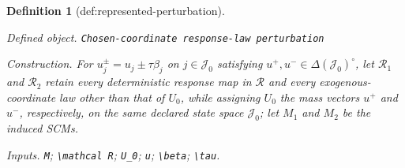\documentclass{article}
\newtheorem{definition}{Definition}
\begin{document}
\begin{definition}[def:represented-perturbation]\label{def:represented-perturbation}
\par\smallskip\noindent\emph{Defined object.} \texttt{Chosen-\allowbreak{}coordinate response-\allowbreak{}law perturbation}
\par\smallskip\noindent\emph{Construction.} For \(u^{\pm}_j=u_j\pm\tau\beta_j\) on \(j\in\mathcal J_0\) satisfying \(u^+,u^-\in\Delta(\mathcal J_0)^{\circ}\), let \(\mathcal R_1\) and \(\mathcal R_2\) retain every deterministic response map in \(\mathcal R\) and every exogenous-coordinate law other than that of \(U_0\), while assigning \(U_0\) the mass vectors \(u^+\) and \(u^-\), respectively, on the same declared state space \(\mathcal J_0\); let \(M_1\) and \(M_2\) be the induced SCMs.
\par\smallskip\noindent\emph{Inputs.} \texttt{M}; \texttt{\textbackslash{}\allowbreak{}mathcal R}; \texttt{U\_\allowbreak{}0}; \texttt{u}; \texttt{\textbackslash{}\allowbreak{}beta}; \texttt{\textbackslash{}\allowbreak{}tau}.
\end{definition}
\end{document}
